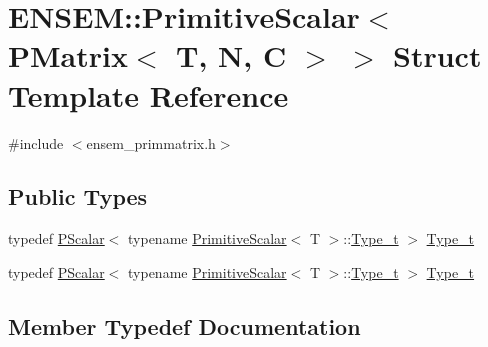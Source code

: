 \hypertarget{structENSEM_1_1PrimitiveScalar_3_01PMatrix_3_01T_00_01N_00_01C_01_4_01_4}{}\section{E\+N\+S\+EM\+:\+:Primitive\+Scalar$<$ P\+Matrix$<$ T, N, C $>$ $>$ Struct Template Reference}
\label{structENSEM_1_1PrimitiveScalar_3_01PMatrix_3_01T_00_01N_00_01C_01_4_01_4}


{\ttfamily \#include $<$ensem\+\_\+primmatrix.\+h$>$}

\subsection*{Public Types}
\begin{DoxyCompactItemize}
\item 
typedef \mbox{\hyperlink{classENSEM_1_1PScalar}{P\+Scalar}}$<$ typename \mbox{\hyperlink{structENSEM_1_1PrimitiveScalar}{Primitive\+Scalar}}$<$ T $>$\+::\mbox{\hyperlink{structENSEM_1_1PrimitiveScalar_3_01PMatrix_3_01T_00_01N_00_01C_01_4_01_4_a86d4d1fddfae8c6be655a4b763d59f64}{Type\+\_\+t}} $>$ \mbox{\hyperlink{structENSEM_1_1PrimitiveScalar_3_01PMatrix_3_01T_00_01N_00_01C_01_4_01_4_a86d4d1fddfae8c6be655a4b763d59f64}{Type\+\_\+t}}
\item 
typedef \mbox{\hyperlink{classENSEM_1_1PScalar}{P\+Scalar}}$<$ typename \mbox{\hyperlink{structENSEM_1_1PrimitiveScalar}{Primitive\+Scalar}}$<$ T $>$\+::\mbox{\hyperlink{structENSEM_1_1PrimitiveScalar_3_01PMatrix_3_01T_00_01N_00_01C_01_4_01_4_a86d4d1fddfae8c6be655a4b763d59f64}{Type\+\_\+t}} $>$ \mbox{\hyperlink{structENSEM_1_1PrimitiveScalar_3_01PMatrix_3_01T_00_01N_00_01C_01_4_01_4_a86d4d1fddfae8c6be655a4b763d59f64}{Type\+\_\+t}}
\end{DoxyCompactItemize}


\subsection{Member Typedef Documentation}
\mbox{\label{structENSEM_1_1PrimitiveScalar_3_01PMatrix_3_01T_00_01N_00_01C_01_4_01_4_a86d4d1fddfae8c6be655a4b763d59f64}} 
